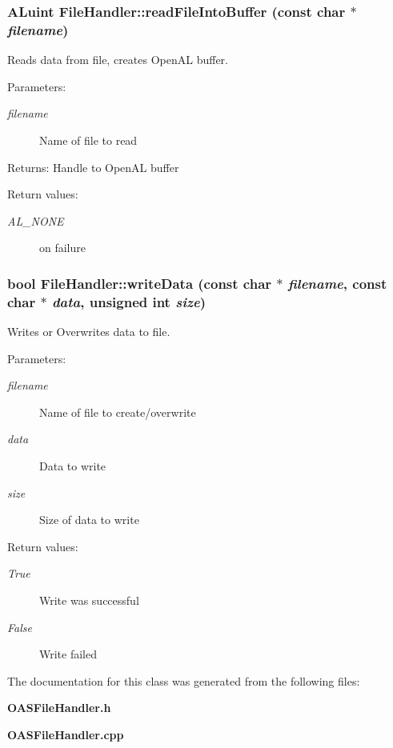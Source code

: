 \subsubsection{\setlength{\rightskip}{0pt plus 5cm}ALuint File\-Handler::read\-File\-Into\-Buffer (const char $\ast$ {\em filename})\hspace{0.3cm}{\tt  [static]}}\label{classoas_1_1FileHandler_aacbbea21152c46acc8b8264ac717200}


Reads data from file, creates Open\-AL buffer. 

\begin{Desc}
\item[Parameters:]
\begin{description}
\item[{\em filename}]Name of file to read \end{description}
\end{Desc}
\begin{Desc}
\item[Returns:]Handle to Open\-AL buffer \end{Desc}
\begin{Desc}
\item[Return values:]
\begin{description}
\item[{\em AL\_\-NONE}]on failure \end{description}
\end{Desc}
\subsubsection{\setlength{\rightskip}{0pt plus 5cm}bool File\-Handler::write\-Data (const char $\ast$ {\em filename}, const char $\ast$ {\em data}, unsigned int {\em size})\hspace{0.3cm}{\tt  [static]}}\label{classoas_1_1FileHandler_097f7cd951e04aeb74f8f50e28e8d653}


Writes or Overwrites data to file. 

\begin{Desc}
\item[Parameters:]
\begin{description}
\item[{\em filename}]Name of file to create/overwrite \item[{\em data}]Data to write \item[{\em size}]Size of data to write \end{description}
\end{Desc}
\begin{Desc}
\item[Return values:]
\begin{description}
\item[{\em True}]Write was successful \item[{\em False}]Write failed \end{description}
\end{Desc}


The documentation for this class was generated from the following files:\begin{CompactItemize}
\item 
\bf{OASFile\-Handler.h}\item 
\bf{OASFile\-Handler.cpp}\end{CompactItemize}
